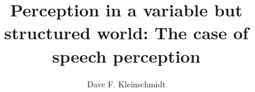 \documentclass[12pt]{report}
\begin{document}
\title{Perception in a variable but structured world: The case of speech perception}
\author{Dave F. Kleinschmidt}
\maketitle









\tableofcontents
\listoftables
\listoffigures





\graphicspath{{chapters/02_ideal_adapter/}}


\graphicspath{{chapters/03_selective_adaptation/}}


\graphicspath{{chapters/04_infer_prior/}}


\graphicspath{{chapters/05_talker_variation/}}




\printbibliography[heading=bibintoc,title={References}]

\appendix

\graphicspath{{chapters/02_ideal_adapter/}}

\end{document}
